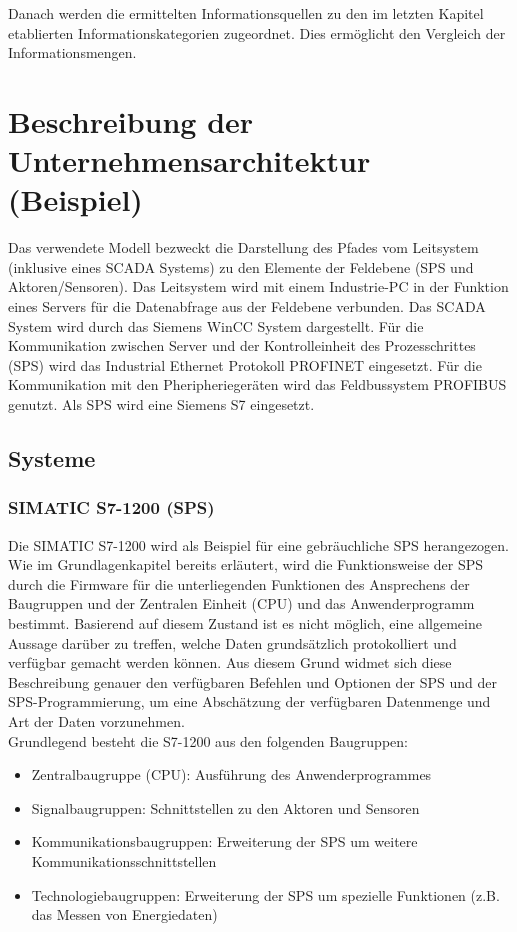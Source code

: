 Danach werden die ermittelten Informationsquellen zu den im letzten Kapitel etablierten Informationskategorien zugeordnet. Dies ermöglicht den Vergleich der Informationsmengen.

\section{Beschreibung der Unternehmensarchitektur (Beispiel)}

Das verwendete Modell bezweckt die Darstellung des Pfades vom Leitsystem (inklusive eines SCADA Systems) zu den Elemente der Feldebene (SPS und Aktoren/Sensoren). Das Leitsystem wird mit einem Industrie-PC in der Funktion eines Servers für die Datenabfrage aus der Feldebene verbunden. Das SCADA System wird durch das Siemens WinCC System dargestellt. Für die Kommunikation zwischen Server und der Kontrolleinheit des Prozesschrittes (SPS) wird das Industrial Ethernet Protokoll PROFINET eingesetzt. Für die Kommunikation mit den Pheripheriegeräten wird das Feldbussystem PROFIBUS genutzt. Als SPS wird eine Siemens S7 eingesetzt.

\subsection{Systeme}
\subsubsection{SIMATIC S7-1200 (SPS)}
Die SIMATIC S7-1200 wird als Beispiel für eine gebräuchliche SPS herangezogen. Wie im Grundlagenkapitel bereits erläutert, wird die Funktionsweise der SPS durch die Firmware für die unterliegenden Funktionen des Ansprechens der Baugruppen und der Zentralen Einheit (CPU) und das Anwenderprogramm bestimmt. Basierend auf diesem Zustand ist es nicht möglich, eine allgemeine Aussage darüber zu treffen, welche Daten grundsätzlich protokolliert und verfügbar gemacht werden können. Aus diesem Grund widmet sich diese Beschreibung genauer den verfügbaren Befehlen und Optionen der SPS und der SPS-Programmierung, um eine Abschätzung der verfügbaren Datenmenge und Art der Daten vorzunehmen.\\ 

Grundlegend besteht die S7-1200 aus den folgenden Baugruppen:
\begin{itemize}
\item Zentralbaugruppe (CPU): Ausführung des Anwenderprogrammes
\item Signalbaugruppen: Schnittstellen zu den Aktoren und Sensoren
\item Kommunikationsbaugruppen: Erweiterung der SPS um weitere Kommunikationsschnittstellen
\item Technologiebaugruppen: Erweiterung der SPS um spezielle Funktionen (z.B. das Messen von Energiedaten)
\end{itemize}

